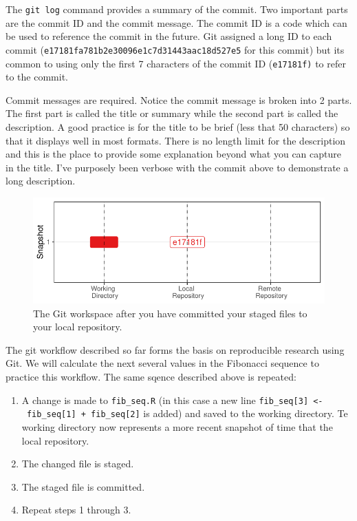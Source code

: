 \documentclass[
  letterpaper,
  DIV=11,
  numbers=noendperiod]{scrreprt}
\begin{document}
The \texttt{git\ log} command provides a summary of the commit. Two
important parts are the commit ID and the commit message. The commit ID
is a code which can be used to reference the commit in the future. Git
assigned a long ID to each commit
(\texttt{e17181fa781b2e30096e1c7d31443aac18d527e5} for this commit) but
its common to using only the first 7 characters of the commit ID
(\texttt{e17181f)} to refer to the commit.

Commit messages are required. Notice the commit message is broken into 2
parts. The first part is called the title or summary while the second
part is called the description. A good practice is for the title to be
brief (less that 50 characters) so that it displays well in most
formats. There is no length limit for the description and this is the
place to provide some explanation beyond what you can capture in the
title. I've purposely been verbose with the commit above to demonstrate
a long description.

\begin{figure}

{\centering \includegraphics{basics_files/figure-pdf/fig-push-1.pdf}

}

\caption{\label{fig-push}The Git workspace after you have committed your
staged files to your local repository.}

\end{figure}

The git workflow described so far forms the basis on reproducible
research using Git. We will calculate the next several values in the
Fibonacci sequence to practice this workflow. The same sqence described
above is repeated:

\begin{enumerate}
\def\labelenumi{\arabic{enumi}.}
\item
  A change is made to \texttt{fib\_seq.R} (in this case a new line
  \texttt{fib\_seq{[}3{]}\ \textless{}-\ fib\_seq{[}1{]}\ +\ fib\_seq{[}2{]}}
  is added) and saved to the working directory. Te working directory now
  represents a more recent snapshot of time that the local repository.
\item
  The changed file is staged.
\item
  The staged file is committed.
\item
  Repeat steps 1 through 3.
\end{enumerate}
\end{document}
